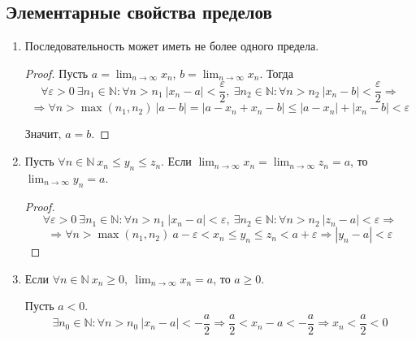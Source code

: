 \subsection{Элементарные свойства пределов}
\begin{enumerate}
	\item Последовательность может иметь не более одного предела.
	\begin{proof}
	Пусть $\displaystyle a = \lim_{n \to \infty} x_n$, $\displaystyle b = \lim_{n \to \infty} x_n$.
	Тогда
	\begin{equation*}
	\forall \varepsilon > 0 \
	\exists n_1 \in \mathbb N \colon \forall n > n_1 \ |x_n - a| < \frac\varepsilon2, \
	\exists n_2 \in \mathbb N \colon \forall n > n_2 \ |x_n - b| < \frac\varepsilon2 \Rightarrow
	\end{equation*}
	\begin{equation*}
	\Rightarrow \forall n > \max(n_1, n_2) \ |a - b| = |a - x_n + x_n - b| \leqslant |a - x_n| + |x_n - b| < \varepsilon
	\end{equation*}
	
	Значит, $a = b$.
	\end{proof}
	
	\item \begin{theorem}
	Пусть $\forall n \in \mathbb N \ x_n \leqslant y_n \leqslant z_n$.
	Если $\displaystyle \lim_{n \to \infty} x_n = \lim_{n \to \infty} z_n = a$, то $\displaystyle \lim_{n \to \infty} y_n = a$.
	\end{theorem}
	\begin{proof}
	\begin{equation*}
	\forall \varepsilon > 0 \
	\exists n_1 \in \mathbb N \colon \forall n > n_1 \ |x_n - a| < \varepsilon, \
	\exists n_2 \in \mathbb N \colon \forall n > n_2 \ |z_n - a| < \varepsilon \Rightarrow
	\end{equation*}
	\begin{equation*}
	\Rightarrow \forall n > \max(n_1, n_2) \ a - \varepsilon < x_n \leqslant y_n \leqslant z_n < a + \varepsilon \Rightarrow |y_n - a| < \varepsilon
	\end{equation*}
	\end{proof}
	
	\item Если $\displaystyle \forall n \in \mathbb N \ x_n \geqslant 0, \ \lim_{n \to \infty} x_n = a$, то $a \geqslant 0$.
	\begin{proofcontra}
	Пусть $a < 0$.
	\begin{equation*}
	\exists n_0 \in \mathbb N \colon \forall n > n_0 \ |x_n - a| < -\frac{a}2 \Rightarrow
	\frac{a}2 < x_n - a < -\frac{a}2 \Rightarrow
	x_n < \frac{a}2 < 0
	\end{equation*}
	

\end{proofcontra}
\end{enumerate}
